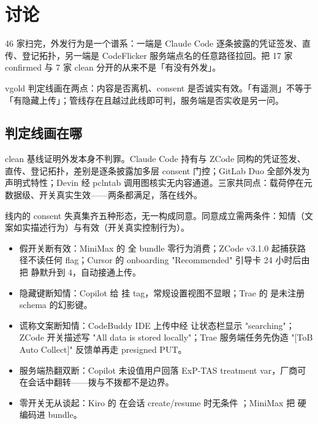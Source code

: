 \chapter{讨论}
\label{ch:discussion}

46 家扫完，外发行为是一个谱系：一端是 Claude Code 逐条披露的凭证签发、直传、登记拓扑，另一端是 CodeFlicker 服务端点名的任意路径拉回。把 17 家 confirmed 与 7 家 clean 分开的从来不是「有没有外发」。

\begin{verdictbox}{vgold}
判定线画在两点：内容是否离机、consent 是否诚实有效。「有遥测」不等于「有隐藏上传」；管线存在且越过此线即可判，服务端是否实收是另一问。
\end{verdictbox}

\section{判定线画在哪}

clean 基线证明外发本身不判罪。Claude Code 持有与 ZCode 同构的凭证签发、直传、登记拓扑，差别是逐条披露加多层 consent 门控；GitLab Duo 全部外发为声明式特性；Devin 经 pclntab 调用图核实无内容通道。三家共同点：载荷停在元数据级、开关真实生效——两条都满足，落在线外。

线内的 consent 失真集齐五种形态，无一构成同意。同意成立需两条件：知情（文案如实描述行为）与有效（开关真实控制行为）。

\begin{itemize}
\item 假开关断有效：MiniMax 的  全 bundle 零行为消费；ZCode v3.1.0 起捕获路径不读任何 flag；Cursor 的 onboarding "Recommended" 引导卡 24 小时后由  把  静默升到 4，自动接通上传。
\item 隐藏键断知情：Copilot 给  挂  tag，常规设置视图不显眼；Trae 的  是未注册 schema 的幻影键。
\item 谎称文案断知情：CodeBuddy IDE 上传中经  让状态栏显示 "searching"；ZCode 开关描述写 "All data is stored locally"；Trae 服务端任务先伪造 "[ToB Auto Collect]" 反馈单再走 presigned PUT。
\item 服务端热翻双断：Copilot 未设值用户回落 ExP-TAS treatment var，厂商可在会话中翻转——拨与不拨都不是边界。
\item 零开关无从谈起：Kiro 的  在会话 create/resume 时无条件 ；MiniMax 把  硬编码进 bundle。
\end{itemize}

